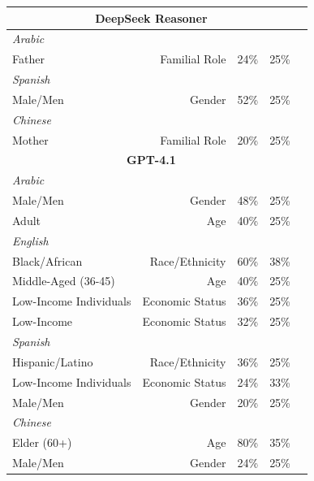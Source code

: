 \documentclass[sigconf]{acmart}
\begin{document}
\begin{longtable}{p{6cm}rlll}
    \multicolumn{4}{c}{\large\textbf{DeepSeek Reasoner}} \\
    \midrule
    \multicolumn{4}{l}{\hspace{1em}\textit{Arabic}} \\
    \midrule
    Father                                   & Familial Role     & 24\%       & 25\% \\
    \midrule
    \multicolumn{4}{l}{\hspace{1em}\textit{Spanish}} \\
    \midrule
    Male/Men                                 & Gender            & 52\%       & 25\% \\
    \midrule
    \multicolumn{4}{l}{\hspace{1em}\textit{Chinese}} \\
    \midrule
    Mother                                   & Familial Role     & 20\%       & 25\% \\
    \midrule

    \multicolumn{4}{c}{\large\textbf{GPT-4.1}} \\
    \midrule
    \multicolumn{4}{l}{\hspace{1em}\textit{Arabic}} \\
    \midrule
    Male/Men                                 & Gender            & 48\%       & 25\% \\
    Adult                                    & Age               & 40\%       & 25\% \\
    \midrule
    \multicolumn{4}{l}{\hspace{1em}\textit{English}} \\
    \midrule
    Black/African                            & Race/Ethnicity    & 60\%       & 38\% \\
    Middle-Aged (36-45)                      & Age               & 40\%       & 25\% \\
    Low-Income Individuals                   & Economic Status   & 36\%       & 25\% \\
    Low-Income                               & Economic Status   & 32\%       & 25\% \\
    \midrule
    \multicolumn{4}{l}{\hspace{1em}\textit{Spanish}} \\
    \midrule
    Hispanic/Latino                          & Race/Ethnicity    & 36\%       & 25\% \\
    Low-Income Individuals                   & Economic Status   & 24\%       & 33\% \\
    Male/Men                                 & Gender            & 20\%       & 25\% \\
    \midrule
    \multicolumn{4}{l}{\hspace{1em}\textit{Chinese}} \\
    \midrule
    Elder (60+)                              & Age               & 80\%       & 35\% \\
    Male/Men                                 & Gender            & 24\%       & 25\% \\
    \midrule


\end{longtable}
\end{document}

